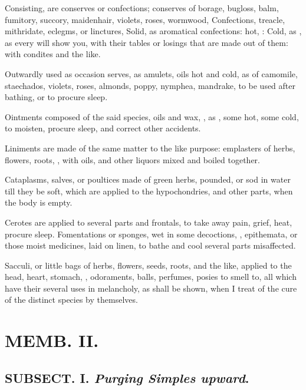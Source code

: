 {Consisting, are conserves or confections; conserves of borage, bugloss, balm, fumitory, succory, maidenhair, violets, roses, wormwood, \etc{} Confections, treacle, mithridate, eclegms, or linctures, \etc{} Solid, as aromatical confections: hot, : Cold, as , \etc{} as every  will show you, with their tables or losings that are made out of them: with condites and the like.

Outwardly used as occasion serves, as amulets, oils hot and cold, as of camomile, staechados, violets, roses, almonds, poppy, nymphea, mandrake, \etc{} to be used after bathing, or to procure sleep.

Ointments composed of the said species, oils and wax, \etc{}, as , some hot, some cold, to moisten, procure sleep, and correct other accidents.

Liniments are made of the same matter to the like purpose: emplasters of herbs, flowers, roots, \etc{}, with oils, and other liquors mixed and boiled together.

Cataplasms, salves, or poultices made of green herbs, pounded, or sod in water till they be soft, which are applied to the hypochondries, and other parts, when the body is empty.

Cerotes are applied to several parts and frontals, to take away pain, grief, heat, procure sleep. Fomentations or sponges, wet in some decoctions, \etc{}, epithemata, or those moist medicines, laid on linen, to bathe and cool several parts misaffected.

Sacculi, or little bags of herbs, flowers, seeds, roots, and the like, applied to the head, heart, stomach, \etc{}, odoraments, balls, perfumes, posies to smell to, all which have their several uses in melancholy, as shall be shown, when I treat of the cure of the distinct species by themselves.

\chapter{ MEMB. II.}


\section{ SUBSECT. I. \emph{Purging Simples upward}.}


}
